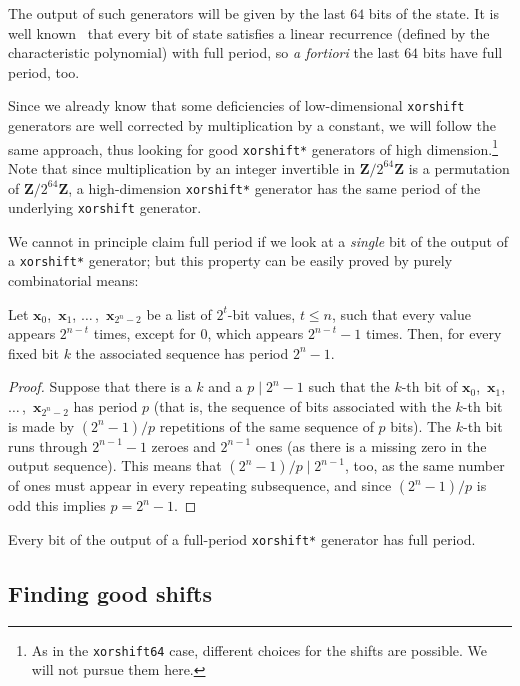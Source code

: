 \documentclass{acmsmalltr}
\newcommand{\Z}{\mathbf Z}
\newcommand{\lstt}[2]{${#1}_0$,~${#1}_1$, $\dots\,$,~${#1}_{#2-2}$}
\newcommand{\xorshift}[1][]{\texttt{xorshift#1}\xspace}
\newcommand{\xorshifts}[1][]{\texttt{xorshift#1*}\xspace}
\begin{document}
The output of such generators will be given by the last $64$ bits of
the state. It is well known~\cite{BreNMXRNG,NieRNGQMCM} that every bit of
state satisfies a linear recurrence (defined by the characteristic
polynomial) with full period, so \textit{a fortiori} the last $64$ bits
have full period, too. 

Since we already know that
some deficiencies of low-dimensional \xorshift generators are well corrected by
multiplication by a constant, we will follow the same approach, thus looking for
good \xorshifts generators of high dimension.\footnote{As in the \xorshift[64] case, different choices for the shifts
are possible. We will not pursue them here.} Note that since
multiplication by an integer invertible in $\Z/2^{64}\Z$ is a permutation of
$\Z/2^{64}\Z$, a high-dimension \xorshifts generator has the same
period of the underlying \xorshift generator.

We cannot in principle claim full period if we look at a \emph{single}
bit of the output of a \xorshifts generator; but this property can be easily
proved by purely combinatorial means:

\begin{proposition}
\label{prop:bit}
Let \lstt{\bm x}{2^n} be a list of $2^t$-bit values, $t\leq n$, such that every
value appears $2^{n-t}$ times, except for $0$, which appears $2^{n-t}-1$ times.
Then, for every fixed bit $k$ the associated sequence has
period $2^n-1$.
\end{proposition}
\begin{proof}
Suppose that there is a $k$ and a $p\mid 2^n-1$ such that the $k$-th
bit of \lstt{\bm x}{2^n} has period $p$ (that is, the sequence of bits
associated with the $k$-th bit is made by $(2^n-1)/p$ repetitions of
the same sequence of $p$ bits). The $k$-th bit runs through $2^{n-1}-1$ zeroes
and $2^{n-1}$ ones (as there is a missing zero in the output sequence).
This means that $(2^n-1)/p\mid 2^{n-1}$, too, as the same number of ones must appear in every repeating subsequence, and
since $(2^n-1)/p$ is odd this implies $p=2^n-1$.
\end{proof}

\begin{corollary}
Every bit of the output of a full-period \xorshifts generator
has full period.
\end{corollary}

\subsection{Finding good shifts}
\end{document}
